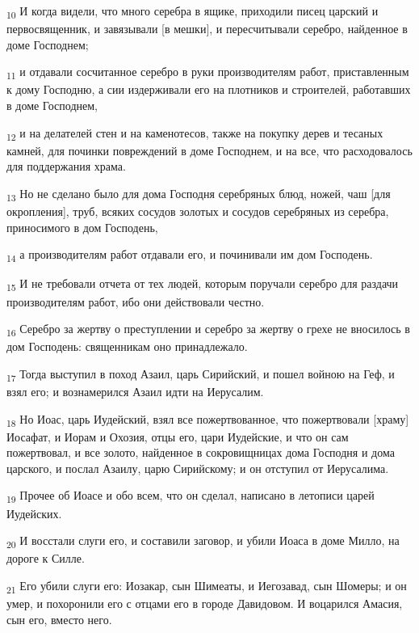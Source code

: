\begin{tcolorbox}
\textsubscript{10} И когда видели, что много серебра в ящике, приходили писец царский и первосвященник, и завязывали [в мешки], и пересчитывали серебро, найденное в доме Господнем;
\end{tcolorbox}
\begin{tcolorbox}
\textsubscript{11} и отдавали сосчитанное серебро в руки производителям работ, приставленным к дому Господню, а сии издерживали его на плотников и строителей, работавших в доме Господнем,
\end{tcolorbox}
\begin{tcolorbox}
\textsubscript{12} и на делателей стен и на каменотесов, также на покупку дерев и тесаных камней, для починки повреждений в доме Господнем, и на все, что расходовалось для поддержания храма.
\end{tcolorbox}
\begin{tcolorbox}
\textsubscript{13} Но не сделано было для дома Господня серебряных блюд, ножей, чаш [для окропления], труб, всяких сосудов золотых и сосудов серебряных из серебра, приносимого в дом Господень,
\end{tcolorbox}
\begin{tcolorbox}
\textsubscript{14} а производителям работ отдавали его, и починивали им дом Господень.
\end{tcolorbox}
\begin{tcolorbox}
\textsubscript{15} И не требовали отчета от тех людей, которым поручали серебро для раздачи производителям работ, ибо они действовали честно.
\end{tcolorbox}
\begin{tcolorbox}
\textsubscript{16} Серебро за жертву о преступлении и серебро за жертву о грехе не вносилось в дом Господень: священникам оно принадлежало.
\end{tcolorbox}
\begin{tcolorbox}
\textsubscript{17} Тогда выступил в поход Азаил, царь Сирийский, и пошел войною на Геф, и взял его; и вознамерился Азаил идти на Иерусалим.
\end{tcolorbox}
\begin{tcolorbox}
\textsubscript{18} Но Иоас, царь Иудейский, взял все пожертвованное, что пожертвовали [храму] Иосафат, и Иорам и Охозия, отцы его, цари Иудейские, и что он сам пожертвовал, и все золото, найденное в сокровищницах дома Господня и дома царского, и послал Азаилу, царю Сирийскому; и он отступил от Иерусалима.
\end{tcolorbox}
\begin{tcolorbox}
\textsubscript{19} Прочее об Иоасе и обо всем, что он сделал, написано в летописи царей Иудейских.
\end{tcolorbox}
\begin{tcolorbox}
\textsubscript{20} И восстали слуги его, и составили заговор, и убили Иоаса в доме Милло, на дороге к Силле.
\end{tcolorbox}
\begin{tcolorbox}
\textsubscript{21} Его убили слуги его: Иозакар, сын Шимеаты, и Иегозавад, сын Шомеры; и он умер, и похоронили его с отцами его в городе Давидовом. И воцарился Амасия, сын его, вместо него.
\end{tcolorbox}
